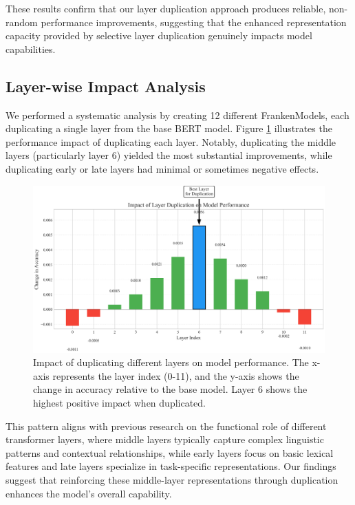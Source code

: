 \documentclass[conference]{IEEEtran}
\begin{document}
These results confirm that our layer duplication approach produces reliable, non-random performance improvements, suggesting that the enhanced representation capacity provided by selective layer duplication genuinely impacts model capabilities.

\subsection{Layer-wise Impact Analysis}
We performed a systematic analysis by creating 12 different FrankenModels, each duplicating a single layer from the base BERT model. Figure \ref{fig:layer_impact} illustrates the performance impact of duplicating each layer. Notably, duplicating the middle layers (particularly layer 6) yielded the most substantial improvements, while duplicating early or late layers had minimal or sometimes negative effects.

\begin{figure}[!t]
\centering
\includegraphics[width=\linewidth]{layer_impact.png}
\caption{Impact of duplicating different layers on model performance. The x-axis represents the layer index (0-11), and the y-axis shows the change in accuracy relative to the base model. Layer 6 shows the highest positive impact when duplicated.}
\label{fig:layer_impact}
\end{figure}

This pattern aligns with previous research on the functional role of different transformer layers, where middle layers typically capture complex linguistic patterns and contextual relationships, while early layers focus on basic lexical features and late layers specialize in task-specific representations. Our findings suggest that reinforcing these middle-layer representations through duplication enhances the model's overall capability.
\end{document}
